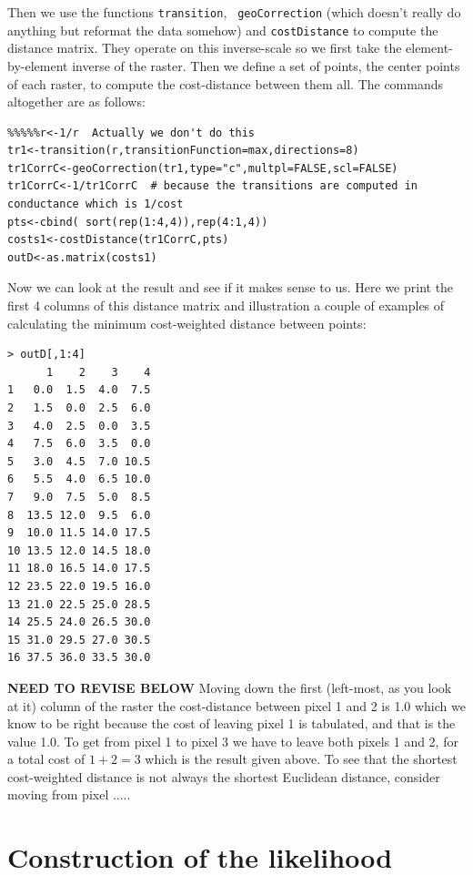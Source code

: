 Then we use the functions \mbox{\tt transition}, \mbox{\tt
  geoCorrection} (which doesn't really do anything but reformat the
data somehow) and \mbox{\tt costDistance} to compute the distance
matrix. They operate on this inverse-scale so we first take the 
element-by-element inverse of the raster. Then we define a set of points,
the center points of each raster, to compute the cost-distance between
them all. The commands altogether are as follows:
\begin{verbatim}
%%%%%r<-1/r  Actually we don't do this
tr1<-transition(r,transitionFunction=max,directions=8)
tr1CorrC<-geoCorrection(tr1,type="c",multpl=FALSE,scl=FALSE)
tr1CorrC<-1/tr1CorrC  # because the transitions are computed in conductance which is 1/cost
pts<-cbind( sort(rep(1:4,4)),rep(4:1,4))
costs1<-costDistance(tr1CorrC,pts)
outD<-as.matrix(costs1)
\end{verbatim}
Now we can look at the result and see if it makes sense to us. Here we
print the first 4 columns of this distance matrix and illustration a
couple of examples of calculating the minimum cost-weighted distance
between points:
\small{
\begin{verbatim}
> outD[,1:4]
      1    2    3    4
1   0.0  1.5  4.0  7.5
2   1.5  0.0  2.5  6.0
3   4.0  2.5  0.0  3.5
4   7.5  6.0  3.5  0.0
5   3.0  4.5  7.0 10.5
6   5.5  4.0  6.5 10.0
7   9.0  7.5  5.0  8.5
8  13.5 12.0  9.5  6.0
9  10.0 11.5 14.0 17.5
10 13.5 12.0 14.5 18.0
11 18.0 16.5 14.0 17.5
12 23.5 22.0 19.5 16.0
13 21.0 22.5 25.0 28.5
14 25.5 24.0 26.5 30.0
15 31.0 29.5 27.0 30.5
16 37.5 36.0 33.5 30.0
\end{verbatim}
}
{\bf NEED TO REVISE BELOW}
Moving down the first (left-most, as you look at it) column of the
raster the cost-distance between pixel 1 and 2 is 1.0 which we know to
be right because the cost of leaving pixel 1 is tabulated, and that is
the value 1.0.  To get from pixel 1 to pixel 3 we have to leave both
pixels 1 and 2, for a total cost of $1+2 = 3$ which is the result
given above.  To see that the shortest cost-weighted distance is not always the
shortest Euclidean distance, consider moving from pixel .....



\section{Construction of the likelihood}

